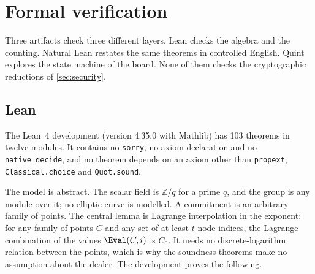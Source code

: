 \section{Formal verification}\label{sec:formal}

Three artifacts check three different layers. Lean checks the algebra and the counting. Natural Lean restates the same theorems in controlled English. Quint explores the state machine of the board. None of them checks the cryptographic reductions of \cref{sec:security}.

\subsection{Lean}

The Lean~4 development (version 4.35.0 with Mathlib) has 103 theorems in twelve modules. It contains no \texttt{sorry}, no axiom declaration and no \texttt{native\_decide}, and no theorem depends on an axiom other than \texttt{propext}, \texttt{Classical.choice} and \texttt{Quot.sound}.

The model is abstract. The scalar field is $\mathbb{Z}/q$ for a prime $q$, and the group is any module over it; no elliptic curve is modelled. A commitment is an arbitrary family of points. The central lemma is Lagrange interpolation in the exponent: for any family of points $C$ and any set of at least $t$ node indices, the Lagrange combination of the values $\Eval(C, i)$ is $C_0$. It needs no discrete-logarithm relation between the points, which is why the soundness theorems make no assumption about the dealer. The development proves the following.

